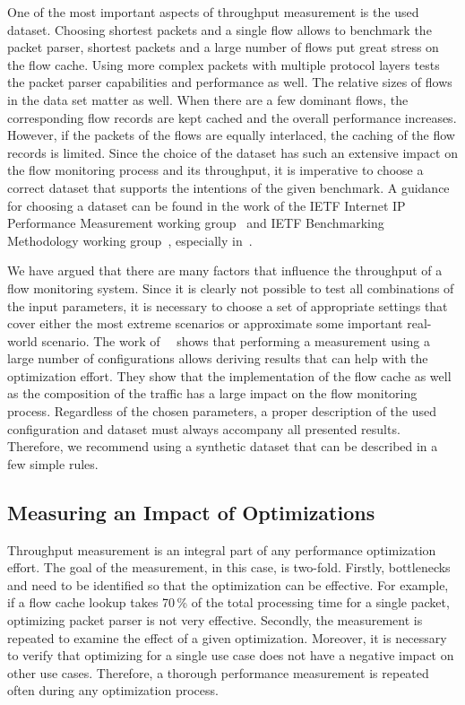 One of the most important aspects of throughput measurement is the used dataset. Choosing shortest packets and a single flow allows to benchmark the packet parser, shortest packets and a large number of flows put great stress on the flow cache. Using more complex packets with multiple protocol layers tests the packet parser capabilities and performance as well. The relative sizes of flows in the data set matter as well. When there are a few dominant flows, the corresponding flow records are kept cached and the overall performance increases. However, if the packets of the flows are equally interlaced, the caching of the flow records is limited. Since the choice of the dataset has such an extensive impact on the flow monitoring process and its throughput, it is imperative to choose a correct dataset that supports the intentions of the given benchmark. A guidance for choosing a dataset can be found in the work of the IETF Internet IP Performance Measurement working group~\cite{IESG-1997-IP} and IETF Benchmarking Methodology working group~\cite{IESG-1989-Benchmarking}, especially in~\cite{rfc2330, rfc6985}.

We have argued that there are many factors that influence the throughput of a flow monitoring system. Since it is clearly not possible to test all combinations of the input parameters, it is necessary to choose a set of appropriate settings that cover either the most extreme scenarios or approximate some important real-world scenario. The work of~\citeauthor{Nassopulos-2014-Flow}~\cite{Nassopulos-2014-Flow} shows that performing a measurement using a large number of configurations allows deriving results that can help with the optimization effort. They show that the implementation of the flow cache as well as the composition of the traffic has a large impact on the flow monitoring process. Regardless of the chosen parameters, a proper description of the used configuration and dataset must always accompany all presented results. Therefore, we recommend using a synthetic dataset that can be described in a few simple rules.


\subsection{Measuring an Impact of Optimizations}

Throughput measurement is an integral part of any performance optimization effort. The goal of the measurement, in this case, is two-fold. Firstly, bottlenecks and need to be identified so that the optimization can be effective. For example, if a flow cache lookup takes 70\,\% of the total processing time for a single packet, optimizing packet parser is not very effective. Secondly, the measurement is repeated to examine the effect of a given optimization. Moreover, it is necessary to verify that optimizing for a single use case does not have a negative impact on other use cases. Therefore, a thorough performance measurement is repeated often during any optimization process.

